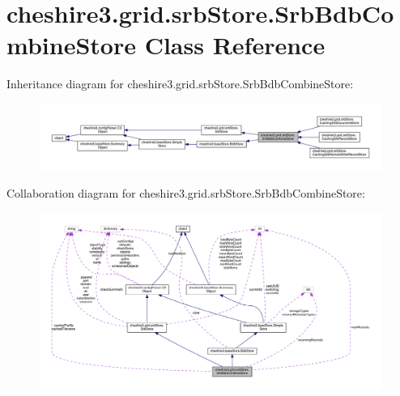 \hypertarget{classcheshire3_1_1grid_1_1srb_store_1_1_srb_bdb_combine_store}{\section{cheshire3.\-grid.\-srb\-Store.\-Srb\-Bdb\-Combine\-Store Class Reference}
\label{classcheshire3_1_1grid_1_1srb_store_1_1_srb_bdb_combine_store}
}


Inheritance diagram for cheshire3.\-grid.\-srb\-Store.\-Srb\-Bdb\-Combine\-Store\-:
\nopagebreak
\begin{figure}[H]
\begin{center}
\leavevmode
\includegraphics[width=350pt]{classcheshire3_1_1grid_1_1srb_store_1_1_srb_bdb_combine_store__inherit__graph}
\end{center}
\end{figure}


Collaboration diagram for cheshire3.\-grid.\-srb\-Store.\-Srb\-Bdb\-Combine\-Store\-:
\nopagebreak
\begin{figure}[H]
\begin{center}
\leavevmode
\includegraphics[width=350pt]{classcheshire3_1_1grid_1_1srb_store_1_1_srb_bdb_combine_store__coll__graph}
\end{center}
\end{figure}
